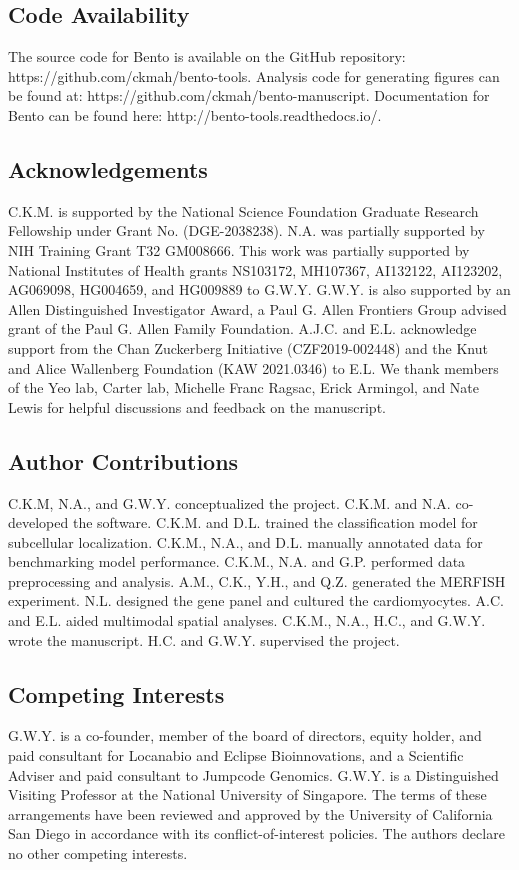 \subsection{Code Availability}
The source code for Bento is available on the GitHub repository: \newline https://github.com/ckmah/bento-tools. Analysis code for generating figures can be found at: https://github.com/ckmah/bento-manuscript. Documentation for Bento can be found here: http://bento-tools.readthedocs.io/.

\subsection{Acknowledgements}
C.K.M. is supported by the National Science Foundation Graduate Research Fellowship under Grant No. (DGE-2038238). N.A. was partially supported by NIH Training Grant T32 GM008666. This work was partially supported by National Institutes of Health grants NS103172, MH107367, AI132122, AI123202, AG069098, HG004659, and HG009889 to G.W.Y. G.W.Y. is also supported by an Allen Distinguished Investigator Award, a Paul G. Allen Frontiers Group advised grant of the Paul G. Allen Family Foundation. A.J.C. and E.L. acknowledge support from the Chan Zuckerberg Initiative (CZF2019-002448) and the Knut and Alice Wallenberg Foundation (KAW 2021.0346) to E.L. We thank members of the Yeo lab, Carter lab, Michelle Franc Ragsac, Erick Armingol, and Nate Lewis for helpful discussions and feedback on the manuscript.

\subsection{Author Contributions}
C.K.M, N.A., and G.W.Y. conceptualized the project. C.K.M. and N.A. co-developed the software. C.K.M. and D.L. trained the classification model for subcellular localization. C.K.M., N.A., and D.L. manually annotated data for benchmarking model performance. C.K.M., N.A. and G.P. performed data preprocessing and analysis. A.M., C.K., Y.H., and Q.Z. generated the MERFISH experiment. N.L. designed the gene panel and cultured the cardiomyocytes. A.C. and E.L. aided multimodal spatial analyses. C.K.M., N.A., H.C., and G.W.Y. wrote the manuscript. H.C. and G.W.Y. supervised the project.

\subsection{Competing Interests}
G.W.Y. is a co-founder, member of the board of directors, equity holder, and paid consultant for Locanabio and Eclipse Bioinnovations, and a Scientific Adviser and paid consultant to Jumpcode Genomics. G.W.Y. is a Distinguished Visiting Professor at the National University of Singapore. The terms of these arrangements have been reviewed and approved by the University of California San Diego in accordance with its conflict-of-interest policies. The authors declare no other competing interests.
